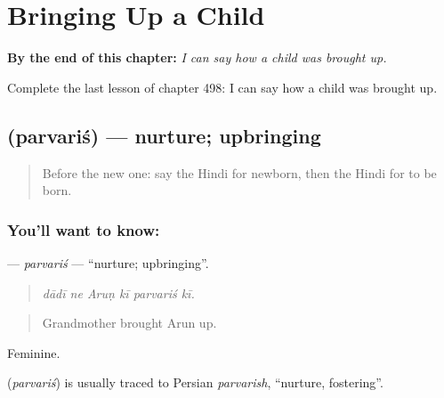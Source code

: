 
\chapter{Bringing Up a Child}
\label{ch:hi-bringing-up-a-child}

\begin{chapteropening}
\textbf{By the end of this chapter:} \emph{I can say how a child was brought up.}

Complete the last lesson of chapter 498: I can say how a child was brought up.
\end{chapteropening}

\section[\texorpdfstring{\hi{परवरिश} (parvariś)}{परवरिश (parvariś)}]{ (parvariś) — nurture; upbringing}

\label{lesson:HI-C498-parvaris}



\begin{quote}
Before the new one: say the Hindi for newborn, then the Hindi for to be born.
\end{quote}

\subsection*{You'll want to know: }
\textbf{} — \emph{parvariś} — \textquotedblleft{}nurture; upbringing\textquotedblright{}.

\begin{quote}
     
\end{quote}

\begin{quote}
\emph{dādī ne Aruṇ kī parvariś kī.}
\end{quote}

\begin{quote}
Grandmother brought Arun up.
\end{quote}

Feminine.

\begin{cousinweb}
\textbf{} (\emph{parvariś}) is usually traced to Persian \emph{parvarish}, \textquotedblleft{}nurture, fostering\textquotedblright{}.
\end{cousinweb}

